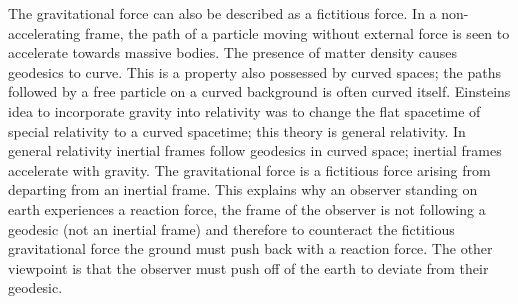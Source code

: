 The gravitational force can also be described as a fictitious force. In a non-accelerating frame, the path of a particle moving without external force is seen to accelerate towards massive bodies. The presence of matter density causes geodesics to curve. This is a property also possessed by curved spaces; the paths followed by a free particle on a curved background is often curved itself. Einsteins idea to incorporate gravity into relativity was to change the flat spacetime of special relativity to a curved spacetime; this theory is general relativity.  In general relativity inertial frames follow geodesics in curved space; inertial frames accelerate with gravity. The gravitational force is a fictitious force arising from departing from an inertial frame. This explains why an observer standing on earth experiences a reaction force, the frame of the observer is not following a geodesic (not an inertial frame) and therefore to counteract the fictitious gravitational force the ground must push back with a reaction force. The other viewpoint is that the observer must push off of the earth to deviate from their geodesic.

